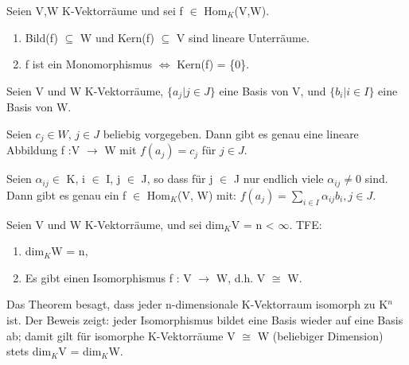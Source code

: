 \begin{lemma}
Seien V,W K-Vektorräume und sei f $\in$ Hom$_K$(V,W).
\begin{enumerate}
\item Bild(f) $\subseteq$ W und Kern(f) $\subseteq$ V sind lineare Unterräume.
\item f ist ein Monomorphismus $\Leftrightarrow$ Kern(f) = \{0\}.
\end{enumerate}
\end{lemma}

\begin{lemma}
Seien V und W K-Vektorräume, $\{a_j | j \in J\}$ eine Basis von V, und $\{b_i | i \in I\}$ eine Basis von W.
\begin{compactenum}
\item Seien $c_j \in W$, $j \in J$ beliebig vorgegeben. Dann gibt es genau eine lineare Abbildung f :V $\to$ W mit $f(a_j)=c_j$ für $j \in J$.
\item Seien $\alpha_{ij} \in$ K, i $\in$ I, j $\in$ J, so dass für j $\in$ J nur endlich viele $\alpha_{ij} \neq 0$ sind. Dann gibt es genau ein f $\in$ Hom$_K$(V, W) mit: $f(a_j) = \sum\nolimits_{i \in I} \alpha_{ij} b_i, j \in J$.
\end{compactenum}
\end{lemma}

\begin{theorem}
Seien V und W K-Vektorräume, und sei dim$_K$V = n < $\infty$. TFE:
\begin{enumerate}
\item dim$_K$W = n,
\item Es gibt einen Isomorphismus f : V $\to$ W, d.h. V $\cong$ W.
\end{enumerate}
\end{theorem}

\begin{remark}
Das Theorem besagt, dass jeder n-dimensionale K-Vektorraum isomorph zu K$^n$ ist. Der Beweis zeigt: jeder Isomorphismus bildet eine Basis wieder auf eine Basis ab; damit gilt für isomorphe K-Vektorräume V $\cong$ W (beliebiger Dimension) stets dim$_K$V = dim$_K$W.
\end{remark}

